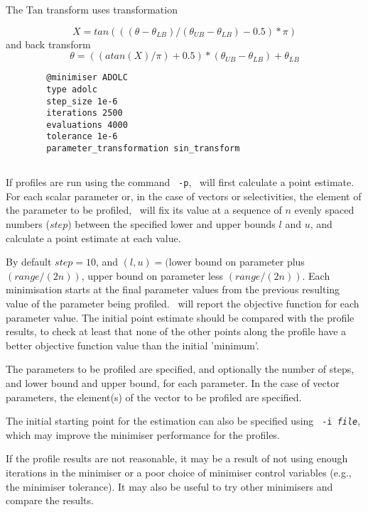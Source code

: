 The Tan transform uses transformation

\begin{equation}
X = tan(((\theta - \theta_{LB}) / (\theta_{UB} - \theta_{LB}) - 0.5) * \pi)
\end{equation}
%
and back transform
\begin{equation}
\theta = ((atan(X) / \pi) + 0.5) * (\theta_{UB} - \theta_{LB}) + \theta_{LB}
\end{equation}

{\small{\begin{verbatim}
		@minimiser ADOLC
		type adolc
		step_size 1e-6
		iterations 2500
		evaluations 4000
		tolerance 1e-6
		parameter_transformation sin_transform
\end{verbatim}}}

\subsection{}\label{sec:Profile}

If profiles are run using the command \texttt{\cname\ -p}, \CNAME\ will first calculate a point estimate. For each scalar parameter or, in the case of vectors or selectivities, the element of the parameter to be profiled, \CNAME\ will fix its value at a sequence of $n$ evenly spaced numbers ($step$) between the specified lower and upper bounds $l$ and $u$, and calculate a point estimate at each value.

By default $step=10$, and $(l, u)=($lower bound on parameter plus $(range/(2n))$, upper bound on parameter less $(range/(2n))$. Each minimisation starts at the final parameter values from the previous resulting value of the parameter being profiled. \CNAME\ will report the objective function for each parameter value. The initial point estimate should be compared with the profile results, to check at least that none of the other points along the profile have a better objective function value than the initial 'minimum'.

The parameters to be profiled are specified, and optionally the number of steps, and lower bound and upper bound, for each parameter. In the case of vector parameters, the element(s) of the vector to be profiled are specified.

The initial starting point for the estimation can also be specified using \texttt{\cname\ -i \emph{file}}, which may improve the minimiser performance for the profiles.

If the profile results are not reasonable, it may be a result of not using enough iterations in the minimiser or a poor choice of minimiser control variables (e.g., the minimiser tolerance). It may also be useful to try other minimisers and compare the results.

